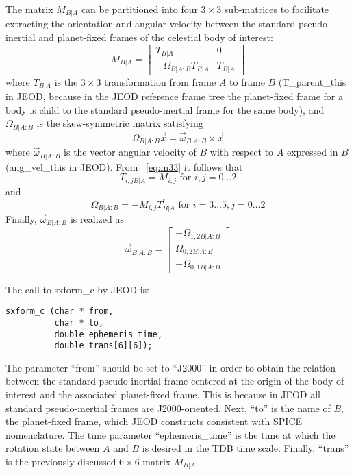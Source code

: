 The matrix $M_{B|A}$ can be partitioned into four $3 \times 3$
sub-matrices to facilitate extracting the orientation and angular velocity
between the standard pseudo-inertial and planet-fixed frames of the celestial
body of interest:
\begin{equation}
M_{B|A} = \left [\begin{array}{cc}
T_{B|A} & 0 \\
-\Omega_{B|A:B}T_{B|A} & T_{B|A}
\end{array} \right ]
\label{eq:m33}
\end{equation}
\noindent where $T_{B|A}$ is the $3 \times 3$ transformation from
frame $A$ to frame $B$ (T\_parent\_this in JEOD, because in the JEOD
reference frame tree the planet-fixed frame for a body is child to the
standard pseudo-inertial frame for the same body), and $\Omega_{B|A:B}$
is the skew-symmetric matrix satisfying
\begin{equation}
\Omega_{B|A:B} \vec{x} = \vec{\omega}_{B|A:B} \times \vec{x}
\label{eq:omega_cross_r}
\end{equation}
\noindent where $\vec{\omega}_{B|A:B}$ is the vector angular velocity of $B$ with
respect to $A$ expressed in $B$ (ang\_vel\_this in JEOD).
From ~\ref{eq:m33} it follows that
\begin{equation}
T_{i, j B|A} = M_{i,j} \mbox{ for }i, j = 0\ldots2
\label{eq:T}
\end{equation}
\noindent and
\begin{equation}
\Omega_{B|A:B} = -M_{i,j}T^t_{B|A} \mbox{ for }i = 3\ldots5, j = 0\ldots2
\label{eq:Omega}
\end{equation}
Finally, $\vec{\omega}_{B|A:B}$ is realized as
\begin{equation}
\vec{\omega}_{B|A:B} = \left [\begin{array}{c}
-\Omega_{1,2 B|A:B} \\
\Omega_{0,2 B|A:B} \\
-\Omega_{0,1 B|A:B} \end{array} \right ]
\label{eq:VecOmega}
\end{equation}

The call to sxform\_c by JEOD is:
\begin{verbatim}
sxform_c (char * from,
          char * to,
          double ephemeris_time,
          double trans[6][6]);
\end{verbatim}
The parameter ``from'' should be set to ``J2000'' in order to obtain the
relation between the standard pseudo-inertial frame centered at the
origin of the body of interest and the associated planet-fixed frame.  This is
because in JEOD all standard pseudo-inertial frames are J2000-oriented.  Next,
``to'' is the name of $B$, the planet-fixed frame, which JEOD constructs
consistent with SPICE nomenclature.  The time parameter ``ephemeris\_time'' is
the time at which the rotation state between $A$ and $B$ is desired in the TDB
time scale. Finally, ``trans'' is the previously discussed $6 \times 6$
matrix $M_{B|A}$.



